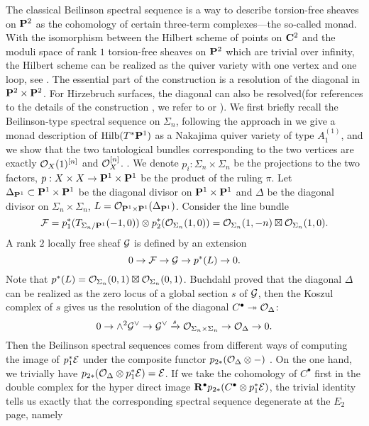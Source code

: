\documentclass[../main.tex]{subfiles}
\begin{document}
The classical Beilinson spectral sequence is a way to describe torsion-free sheaves on $\P^2$ as the cohomology of certain three-term complexes---the so-called monad. With the isomorphism between the Hilbert scheme of points on $\C^2$ and the moduli space of rank $1$ torsion-free sheaves on $\P^2$ which are trivial over infinity, the Hilbert scheme can be realized as the quiver variety with one vertex and one loop, see \cite[Theorem 2.1]{Nakajima}. The essential part of the construction is a resolution of the diagonal in $\P^2\times \P^2$. For Hirzebruch surfaces, the diagonal can also be resolved(for references to the details of the construction , we refer to \cite{Buchdahl1987} or \cite{Aprodu09}). We first briefly recall the Beilinson-type spectral sequence on $\Sigma_{n}$, following the approach in \cite{Nakajima} we give a monad description of $\Hilb(T^*\P^1)$ as a Nakajima quiver variety of type $A_{1}^{(1)}$, and we show that the two tautological bundles corresponding to the two vertices are exactly $\O_{X}(1)^{[n]}$ and $\O_{X}^{[n]}$.  
. 
We denote $p_{i}:\Sigma_{n}\times \Sigma_{n}$ be the projections to the two factors, $p: X\times X\rightarrow \P^1\times \P^1$ be the product of the ruling $\pi$. Let $\Delta_{\P^1}\subset \P^1\times \P^1$ be the diagonal divisor on $\P^1\times \P^1$ and $\Delta$ be the diagonal divisor on $\Sigma_{n}\times \Sigma_{n}$, $L= \O_{\P^1\times \P^1}(\Delta_{\P^1})$. Consider the line bundle 
$$\F = p_{1}^{*}(T_{\Sigma_{n}/\P^1}(-1, 0))\otimes p_{2}^{*}(\O_{\Sigma_{n}}(1, 0))=\O_{\Sigma_{n}}(1,-n)\boxtimes \O_{\Sigma_{n}}(1, 0).$$
A rank $2$ locally free sheaf $\G$ is defined by an extension 
$$0\rightarrow \F\rightarrow \G\rightarrow p^{*}(L)\rightarrow 0.$$
Note that $p^{*}(L)=\O_{\Sigma_{n}}(0,1)\boxtimes \O_{\Sigma_{n}}(0,1)$.
Buchdahl proved that\cite{Buchdahl1987} the diagonal $\Delta$ can be realized as the zero locus of a global section $s$ of $\G$, then the Koszul complex of $s$ gives us the resolution of the diagonal $C^{\bullet}\twoheadrightarrow\O_{\Delta}$: 
$$0\rightarrow \wedge^{2}\G^{\vee}\rightarrow \G^{\vee}\xrightarrow{s} \O_{\Sigma_{n}\times \Sigma_{n}}\rightarrow \O_{\Delta}\rightarrow 0.$$
Then the Beilinson spectral sequences comes from different ways of computing the image of $p_{1}^{*}\E$ under the composite functor $p_{2*}(\O_{\Delta}\otimes -)$ . On the one hand, we trivially have $p_{2*}(\O_{\Delta}\otimes p_{1}^{*}\E)=\E$. If we take the cohomology of $C^{\bullet}$ first in the double complex for the hyper direct image $\dR^{\bullet}p_{2*}(C^{\bullet}\otimes p_{1}^{*}\E)$, the trivial identity tells us exactly that the corresponding spectral sequence degenerate at the $E_{2}$ page, namely
\end{document}
